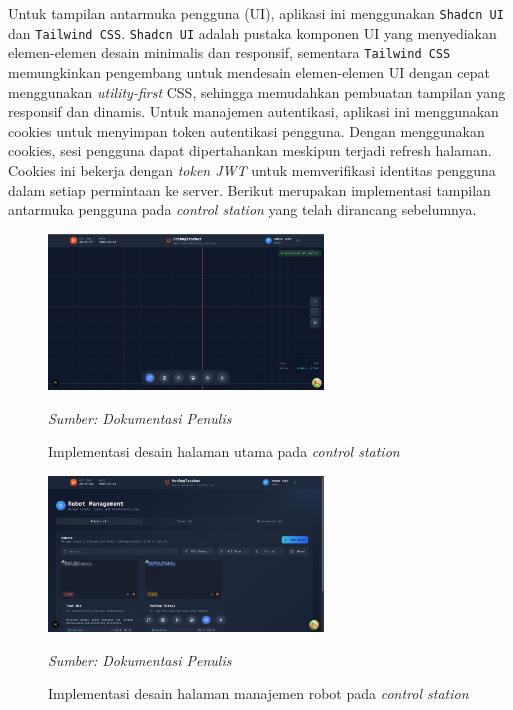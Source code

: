 Untuk tampilan antarmuka pengguna (UI), aplikasi ini menggunakan \texttt{Shadcn UI} dan \texttt{Tailwind CSS}. \texttt{Shadcn UI} adalah pustaka komponen UI yang menyediakan elemen-elemen desain minimalis dan responsif, sementara \texttt{Tailwind CSS} memungkinkan pengembang untuk mendesain elemen-elemen UI dengan cepat menggunakan \textit{utility-first} CSS, sehingga memudahkan pembuatan tampilan yang responsif dan dinamis. Untuk manajemen autentikasi, aplikasi ini menggunakan cookies untuk menyimpan token autentikasi pengguna. Dengan menggunakan cookies, sesi pengguna dapat dipertahankan meskipun terjadi refresh halaman. Cookies ini bekerja dengan \textit{token JWT} untuk memverifikasi identitas pengguna dalam setiap permintaan ke server.  Berikut merupakan implementasi tampilan antarmuka pengguna pada \emph{control station} yang telah dirancang sebelumnya.



\begin{figure}[H]
  \centering
  \includegraphics[width=0.65\textwidth]{gambar/bab3/fe/home.png}
  \caption{Implementasi desain halaman utama pada \emph{control station}}
  \label{fig:home-page}
  \footnotesize\emph{Sumber: Dokumentasi Penulis}
\end{figure}

\begin{figure}[H]
  \centering
  \includegraphics[width=0.65\textwidth]{gambar/bab3/fe/robot.png}
  \caption{Implementasi desain halaman manajemen robot pada \emph{control station}}
  \label{fig:robot-management}
  \footnotesize\emph{Sumber: Dokumentasi Penulis}
\end{figure}

